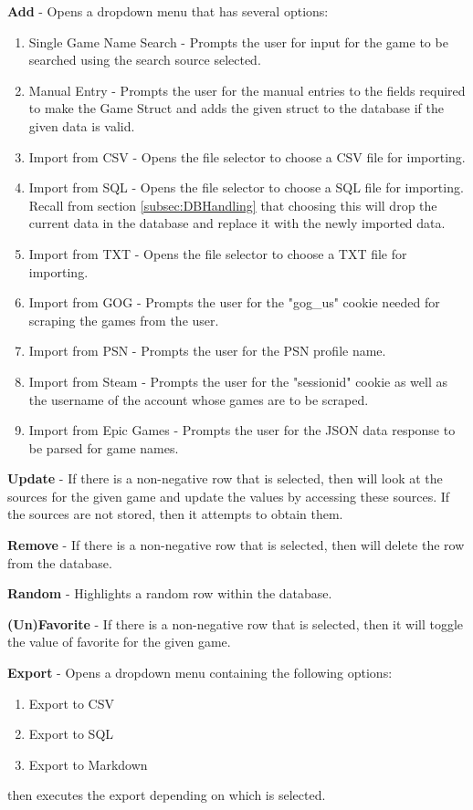 \textbf{Add} - Opens a dropdown menu that has several options:
\begin{enumerate}
	\item Single Game Name Search - Prompts the user for input for the
		game to be searched using the search source selected.
	\item Manual Entry - Prompts the user for
		the manual entries to the fields required to make the Game Struct
		and adds the given struct to the database if the given data is valid.
	\item Import from CSV - Opens the file selector to choose a CSV file
		for importing.
	\item Import from SQL - Opens the file selector to choose a SQL file
		for importing. Recall from section \ref{subsec:DBHandling} that choosing
		this will drop the current data in the database and replace it with
		the newly imported data.
	\item Import from TXT - Opens the file selector to choose a TXT file
		for importing.
	\item Import from GOG - Prompts the user for the
		"gog\_us" cookie needed for scraping the games from the user.
	\item Import from PSN - Prompts the user for the PSN profile name.
	\item Import from Steam - Prompts the user for the "sessionid"
		cookie as well as the username of the account whose games are to be scraped.
	\item Import from Epic Games - Prompts the user for the JSON data
		response to be parsed for game names.
\end{enumerate}

\textbf{Update} - If there is a non-negative row that is selected, then will
look at the sources for the given game and update the values by
accessing these sources. If the sources are not stored, then it
attempts to obtain them.

\textbf{Remove} - If there is a non-negative row that is selected, then will
delete the row from the database.

\textbf{Random} - Highlights a random row within the database.

\textbf{(Un)Favorite} - If there is a non-negative row that is
selected, then it will toggle the value of favorite for the given game.

\textbf{Export} - Opens a dropdown menu containing the following options:
\begin{enumerate}
	\item Export to CSV
	\item Export to SQL
	\item Export to Markdown
\end{enumerate}
then executes the export depending on which is selected.

